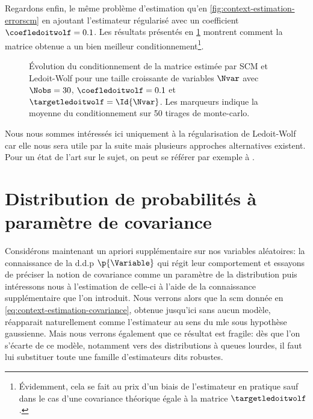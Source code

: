 Regardons enfin, le même problème d'estimation qu'en \cref{fig:context-estimation-errorscm} en ajoutant l'estimateur régularisé avec un coefficient $\coefledoitwolf=0.1$. Les résultats présentés en \cref{fig:context-estimation-condlwf} montrent comment la matrice obtenue a un bien meilleur conditionnement\footnote{\'Evidemment, cela se fait au prix d'un biais de l'estimateur en pratique sauf dans le cas d'une covariance théorique égale à la matrice $\targetledoitwolf$.}.


\begin{figure}[h]
  \begin{center}
        
      \end{center}
  \provLwfcondQR[.5cm]
  \caption{\'Evolution du conditionnement de la matrice estimée par SCM et Ledoit-Wolf pour une taille croissante de variables $\Nvar$ avec $\Nobs=30$, $\coefledoitwolf=0.1$ et $\targetledoitwolf=\Id{\Nvar}$. Les marqueurs indique la moyenne du conditionnement sur 50 tirages de monte-carlo. \provLwfcond}
  \label{fig:context-estimation-condlwf}
\end{figure}



Nous nous sommes intéressés ici uniquement à la régularisation de Ledoit-Wolf car elle nous sera utile par la suite mais plusieurs approches alternatives existent. Pour un état de l'art sur le sujet, on peut se référer par exemple à .


\section{Distribution de probabilités à paramètre de covariance}
\label{sec:context-distributions}

Considérons maintenant un apriori supplémentaire sur nos variables aléatoires: la connaissance de la d.d.p $\p{\Variable}$ qui régit leur comportement et essayons de préciser la notion de covariance comme un paramètre de la distribution puis intéressons nous à l'estimation de celle-ci à l'aide de la connaissance supplémentaire que l'on introduit. Nous verrons alors que la scm donnée en \cref{eq:context-estimation-covariance}, obtenue jusqu'ici sans aucun modèle, réapparait naturellement comme l'estimateur au sens du mle sous hypothèse gaussienne. Mais nous verrons également que ce résultat est fragile: dès que l'on s'écarte de ce modèle, notamment vers des distributions à queues lourdes, il faut lui substituer toute une famille d'estimateurs dits robustes.

